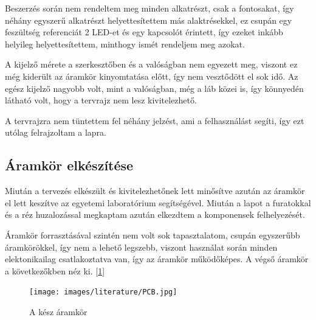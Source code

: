 Beszerzés során nem rendeltem meg minden alkatrészt, csak a fontosakat, így néhány
egyszerű alkatrészt helyettesítettem más alaktrésekkel, ez csupán egy feszültség referenciát
2 LED-et és egy kapcsolót érintett, így ezeket inkább helyileg helyettesítettem, minthogy
ismét rendeljem meg azokat.

A kijelző mérete a szerkesztőben és a valóságban nem egyezett meg, viszont ez még 
kiderült az áramkör kinyomtatása előtt, így nem vesztődött el sok idő. Az egész
kijelző nagyobb volt, mint a valóságban, még a láb közei is, így könnyedén látható
volt, hogy a tervrajz nem lesz kivitelezhető.

A tervrajzra nem tüntettem fel néhány jelzést, ami a felhasználást segíti, így ezt 
utólag felrajzoltam a lapra.

\subsection{Áramkör elkészítése}

Miután a tervezés elkészült és kivitelezhetőnek lett minősítve azután az áramkör
el lett keszítve az egyetemi laboratórium segítségével. Miután a lapot a furatokkal és a réz
huzalozással megkaptam azután elkezdtem a komponensek felhelyezését.

Áramkör forrasztásával szintén nem volt sok tapasztalatom, csupán egyszerűbb
áramkörökkel, így nem a lehető legszebb, viszont használat során minden elektonikailag
csatlakoztatva van, így az áramkör működőképes. A végső áramkör a következőkben néz ki.
[\ref{fig:Aramkor}]


\begin{figure}[h]
    \centering
    \texttt{[image: images/literature/PCB.jpg]}
    \caption{A kész áramkör}
    \label{fig:Aramkor}
\end{figure}


